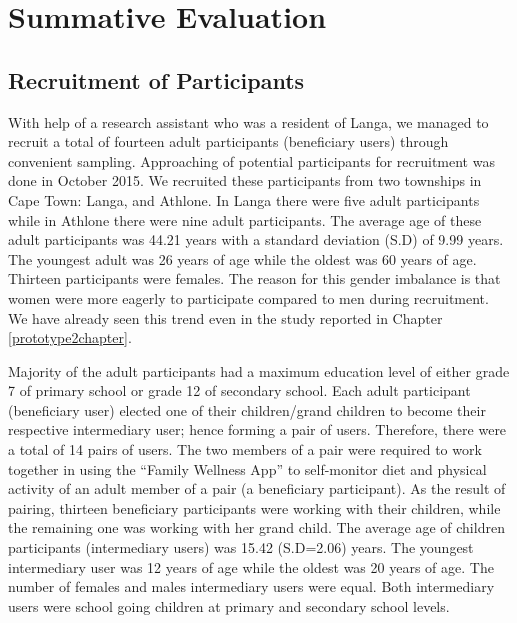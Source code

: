 
\chapter{Summative Evaluation} %

\label{summativeevalchapter} %


\section{Recruitment of Participants}
With help of a research assistant who was a resident of Langa,  we managed to recruit a total of fourteen adult participants (beneficiary users) through convenient sampling. Approaching of potential participants for recruitment was done in October 2015. We recruited these participants from two townships in Cape Town: Langa, and Athlone. In Langa there were five adult participants while in Athlone there were nine adult participants. The average age of these adult participants was 44.21 years with a standard deviation (S.D) of 9.99 years. The youngest adult was 26 years of age while the oldest was 60 years of age. Thirteen participants were females. The reason for this gender imbalance is that women were more eagerly to participate compared to men during recruitment. We have already seen this trend even in the study reported in Chapter \ref{prototype2chapter}.

Majority of the adult participants had a maximum education level of either grade 7 of primary school or grade 12 of secondary school. Each adult participant (beneficiary user) elected one of their children/grand children to become their respective intermediary user; hence forming a pair of users. Therefore, there were a total of 14 pairs of users. The two members of a pair were required to work together in using the ``Family Wellness App'' to self-monitor diet and physical activity of an adult member of a pair (a beneficiary participant). As the result of pairing, thirteen beneficiary participants  were working with their children, while the remaining one was working with her grand child. The average age of children participants (intermediary users) was 15.42 (S.D=2.06) years. The youngest intermediary user was 12 years of age while the oldest was 20 years of age. The number of females and males intermediary users were equal. Both intermediary users were school going children at primary and secondary school levels.

